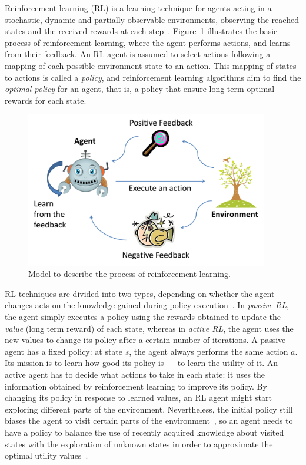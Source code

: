 Reinforcement learning (RL) is a learning technique for agents acting in a stochastic, dynamic and partially observable environments, observing the reached states and the received rewards at each step~\cite{sutton1998reinforcement}. 
Figure~\ref{fig:rl} illustrates the basic process of reinforcement learning, where the agent performs actions, and learns from their feedback. 
An RL agent is assumed to select actions following a mapping of each possible environment state to an action. 
This mapping of states to actions is called a \emph{policy}, and reinforcement learning algorithms aim to find the \emph{optimal policy} for an agent, that is, a policy that ensure long term optimal rewards for each state. 

\begin{figure}[ht]
\centering
\includegraphics[width=400px]{images/rl}
\caption{Model to describe the process of reinforcement learning.}
\label{fig:rl}
\end{figure}

RL techniques are divided into two types, depending on whether the agent changes acts on the knowledge gained during policy execution~\cite{russell1995artificial}. 
In \emph{passive RL}, the agent simply executes a policy using the rewards obtained to update the \emph{value} (long term reward) of each state, whereas in \emph{active RL}, the agent uses the new values to change its policy after a certain number of iterations.
A passive agent has a fixed policy: at state $s$, the agent always performs the same action $a$.
Its mission is to learn how good its policy is --- to learn the utility of it.
An active agent has to decide what actions to take in each state:
it uses the information obtained by reinforcement learning to improve its policy. 
By changing its policy in response to learned values, an RL agent might start exploring different parts of the environment. 
Nevertheless, the initial policy still biases the agent to visit certain parts of the environment~\cite{russell1995artificial}, so an agent needs to have a policy to balance the use of recently acquired knowledge about visited states with the exploration of unknown states in order to approximate the optimal utility values~\cite{ghory2004boardgames}. 




